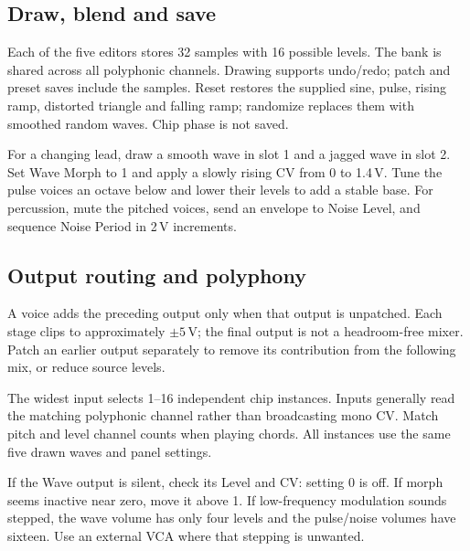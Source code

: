 \subsection{Draw, blend and save}
Each of the five editors stores 32 samples with 16 possible levels. The bank
is shared across all polyphonic channels. Drawing supports undo/redo; patch
and preset saves include the samples. Reset restores the supplied sine,
pulse, rising ramp, distorted triangle and falling ramp; randomize replaces
them with smoothed random waves. Chip phase is not saved.

For a changing lead, draw a smooth wave in slot 1 and a jagged wave in slot 2.
Set Wave Morph to 1 and apply a slowly rising CV from 0 to 1.4\,V. Tune the
pulse voices an octave below and lower their levels to add a stable base.
For percussion, mute the pitched voices, send an envelope to Noise Level,
and sequence Noise Period in 2\,V increments.

\subsection{Output routing and polyphony}
A voice adds the preceding output only when that output is unpatched. Each
stage clips to approximately $\pm5$\,V; the final output is not a headroom-free
mixer. Patch an earlier output separately to remove its contribution from
the following mix, or reduce source levels.

The widest input selects 1--16 independent chip instances. Inputs generally
read the matching polyphonic channel rather than broadcasting mono CV.
Match pitch and level channel counts when playing chords. All instances use
the same five drawn waves and panel settings.

If the Wave output is silent, check its Level and CV: setting 0 is off. If
morph seems inactive near zero, move it above 1. If low-frequency modulation
sounds stepped, the wave volume has only four levels and the pulse/noise
volumes have sixteen. Use an external VCA where that stepping is unwanted.
